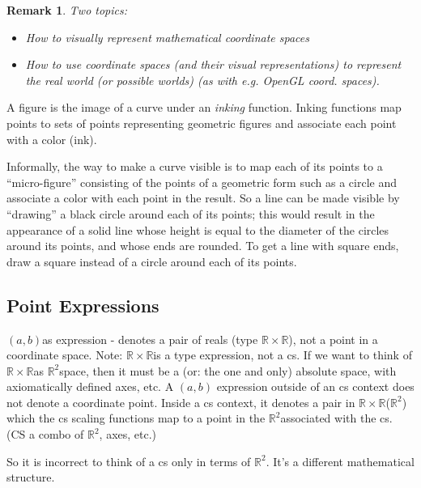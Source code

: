 \documentclass[12pt]{tufte-handout}
\numberwithin{equation}{subsection}
\numberwithin{equation}{subsection}
\newtheorem{remark}{Remark}
\newcommand\cspace{coordinate space}
\newcommand\ab{\((a,b)\)}
\newcommand\RR{\(\mathds{R}\times\mathds{R}\)}
\newcommand\Rtwo{\(\mathds{R}^2\)}
\begin{document}

  \begin{remark}
    Two topics:
    \begin{itemize}
    \item How to visually represent mathematical \cspace{}s
    \item How to use \cspace{}s (and their visual representations) to
      represent the real world (or possible worlds) (as with e.g. OpenGL coord. spaces).
    \end{itemize}
  \end{remark}

  A figure is the image of a curve under an \textit{inking} function.
  Inking functions map points to sets of points representing geometric
  figures and associate each point with a color (ink).

  Informally, the way to make a curve visible is to map each of its
  points to a ``micro-figure'' consisting of the points of a geometric
  form such as a circle and associate a color with each point in the
  result.  So a line can be made visible by ``drawing'' a black circle
  around each of its points; this would result in the appearance of a
  solid line whose height is equal to the diameter of the circles
  around its points, and whose ends are rounded.  To get a line with
  square ends, draw a square instead of a circle around each of its
  points.


  \subsection{Point Expressions}
  \label{subs:pointexprs}

  \ab as expression - denotes a pair of reals (type \RR), not a point in
  a \cspace{}.  Note: \RR is a type expression, not a cs.  If we want to
  think of \RR as \Rtwo space, then it must be a (or: the one and only)
  absolute space, with axiomatically defined axes, etc.  A \ab
  expression outside of an cs context does not denote a coordinate
  point.  Inside a cs context, it denotes a pair in \RR (\Rtwo) which
  the cs scaling functions map to a point in the \Rtwo associated with
  the cs.  (CS a combo of \Rtwo, axes, etc.)

  So it is incorrect to think of a cs only in terms of \Rtwo.  It's a
  different mathematical structure.
\end{document}
